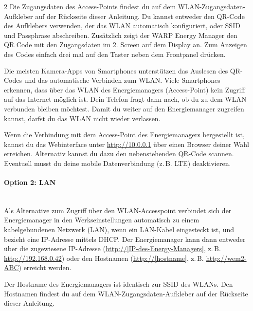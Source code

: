\documentclass[a4paper,10pt]{article}
\begin{document}
\begin{multicols*}{2}
	Die Zugangsdaten des Access-Points findest du auf dem WLAN-Zugangsdaten-Aufkleber
	auf der Rückseite dieser Anleitung. Du kannst entweder den QR-Code des Aufklebers verwenden,
	der das WLAN automatisch konfiguriert, oder SSID und Passphrase abschreiben.
    Zusätzlich zeigt der WARP Energy Manager den QR Code mit den Zugangsdaten im 2. Screen auf dem
    Display an. Zum Anzeigen des Codes einfach drei mal auf den Taster neben dem Frontpanel drücken.

	Die meisten Kamera-Apps von Smartphones unterstützen das Auslesen des
	QR-Codes und das automatische Verbinden zum WLAN. Viele Smartphones
	erkennen, dass über das WLAN des Energiemanagers (Access-Point) kein Zugriff auf das
	Internet möglich ist. Dein Telefon fragt dann nach, ob du zu dem WLAN
	verbunden bleiben möchtest. Damit du weiter auf den Energiemanager zugreifen
	kannst, darfst du das WLAN nicht wieder verlassen.

	\begin{minipage}{0.35\textwidth}
		Wenn die Verbindung mit dem Access-Point des Energiemanagers hergestellt ist, kannst du das Webinterface
		unter \url{http://10.0.0.1} über einen Browser deiner Wahl erreichen.
		Alternativ kannst du dazu den nebenstehenden QR-Code scannen.
		Eventuell musst du deine mobile Datenverbindung (z.\,B. LTE) deaktivieren.
	\end{minipage}\hfill
	\begin{minipage}{0.12\textwidth}
		\begin{flushright}
		\end{flushright}
	\end{minipage}

	\columnbreak

	\paragraph{Option 2: LAN}\ \\
	Als Alternative zum Zugriff über den WLAN-Accesspoint verbindet sich der
	Energiemanager in den Werkseinstellungen automatisch zu einem
	kabelgebundenen Netzwerk (LAN), wenn ein LAN-Kabel eingesteckt ist, und bezieht eine IP-Adresse
	mittels DHCP. Der Energiemanager kann dann entweder über die zugewiesene IP-Adresse
	(\url{http://[IP-des-Energy-Managers]}, z.\,B. \url{http://192.168.0.42})
	oder den Hostnamen (\url{http://[hostname]}, z.\,B. \url{http://wem2-ABC}) erreicht werden.

	Der Hostname des Energiemanagers ist identisch zur SSID des WLANs. Den Hostnamen findest du
	auf dem WLAN-Zugangsdaten-Aufkleber auf der Rückseite dieser Anleitung.


\end{multicols*}
\end{document}
